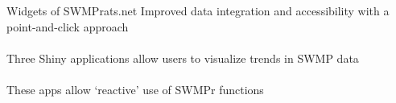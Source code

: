 \documentclass[xcolor=dvipsnames,serif]{beamer}\usepackage[]{graphicx}\usepackage[]{color}
\begin{document}
\begin{frame}{Widgets of SWMPrats.net}
Improved data integration and accessibility with a point-and-click approach \\~\\
Three Shiny applications allow users to visualize trends in SWMP data \\~\\
These apps allow `reactive' use of SWMPr functions \\~\\
\begin{columns}
\begin{column}{0.3\textwidth}
\centerline{}
\end{column}
\begin{column}{0.3\textwidth}
\centerline{}

\end{column}
\end{columns}
\end{frame}
\end{document}

